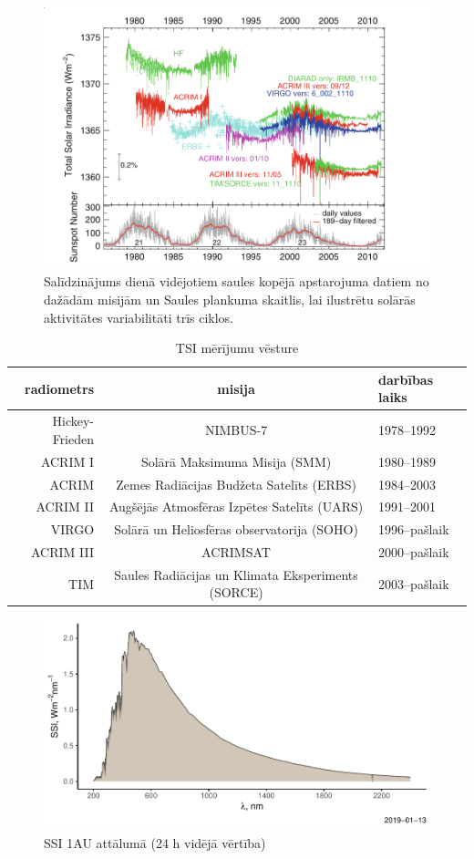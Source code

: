 \begin{figure}[h]
    \centering
    \includegraphics[width=0.6\linewidth]{figures/misc/TSI_misijas.png}
    \caption{Salīdzinājums dienā vidējotiem saules kopējā apstarojuma datiem no dažādām misijām un Saules plankuma skaitlis, lai ilustrētu solārās aktivitātes variabilitāti trīs ciklos. \cite{Frohlich2012}}
    \label{fig:TSI_misijas}
\end{figure}

\begin{table}[h]
    \caption{TSI mērījumu vēsture} %
    \begin{center}
    \begin{tabular}{| r | c | l |}
    \hline
    radiometrs & misija & darbības laiks \\ \hline
    Hickey-Frieden & NIMBUS-7 & 1978--1992  \\ \hline
	ACRIM I & Solārā Maksimuma Misija (SMM) & 1980--1989 \\ \hline
	ACRIM  & Zemes Radiācijas Budžeta Satelīts (ERBS) & 1984--2003 \\ \hline
	ACRIM II & Augšējās Atmosfēras Izpētes Satelīts (UARS) & 1991--2001 \\ \hline
	VIRGO & Solārā un Heliosfēras observatorija (SOHO)& 1996--pašlaik \\ \hline
	ACRIM III & ACRIMSAT  & 2000--pašlaik \\ \hline
	TIM & Saules Radiācijas un Klimata Eksperiments (SORCE) & 2003--pašlaik\\ \hline
    \end{tabular}
    \end{center}
    \label{tab:radiometers}
\end{table}

\begin{figure}[h]
    \centering
    \includegraphics[width=\linewidth]{figures/misc/SSI.pdf}
    \caption{SSI 1AU attālumā (24 h vidējā vērtība) \cite{SSIdata}}
    \label{fig:SSI}
\end{figure}

